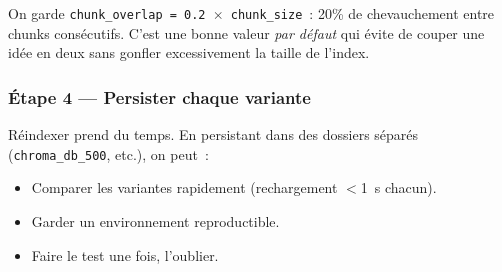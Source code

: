 \documentclass[11pt,a4paper]{article}
\begin{document}
On garde \texttt{chunk\_overlap = 0.2 \(\times\) chunk\_size}~: 20\%
de chevauchement entre chunks consécutifs. C'est une bonne valeur
\emph{par défaut} qui évite de couper une idée en deux sans gonfler
excessivement la taille de l'index.

\subsubsection*{Étape 4 — Persister chaque variante}

Réindexer prend du temps. En persistant dans des dossiers séparés
(\texttt{chroma\_db\_500}, etc.), on peut~:
\begin{itemize}[leftmargin=*]
  \item Comparer les variantes rapidement (rechargement $<$1~s chacun).
  \item Garder un environnement reproductible.
  \item Faire le test une fois, l'oublier.
\end{itemize}
\end{document}
